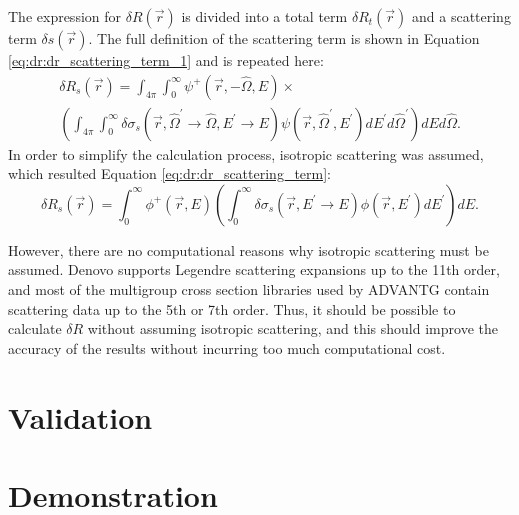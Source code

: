 The expression for $\delta R\left(\vec{r}\right)$ is divided into a total term $\delta R_t\left(\vec{r}\right)$ and a scattering term $\delta s\left(\vec{r}\right)$.
The full definition of the scattering term is shown in Equation \ref{eq:dr:dr_scattering_term_1} and is repeated here:
\begin{multline*}
  \delta R_s\left(\vec{r}\right) =
  \int_{4\pi}\int_0^\infty\psi^+\left(\vec{r},-\hat{\Omega},E\right) \times \\
  \left(\int_{4\pi}\int_0^\infty\delta\sigma_s\left(\vec{r},\hat{\Omega}^\prime\rightarrow\hat{\Omega},E^\prime\rightarrow E\right)\psi\left(\vec{r},\hat{\Omega}^\prime,E^\prime\right)dE^\prime d\hat{\Omega}^\prime\right)dEd\hat{\Omega}.
\end{multline*}
In order to simplify the calculation process, isotropic scattering was assumed, which resulted Equation \ref{eq:dr:dr_scattering_term}:
\begin{equation*}
  \delta R_s\left(\vec{r}\right) =
  \int_0^\infty\phi^+\left(\vec{r},E\right)\left(\int_0^\infty\delta\sigma_s\left(\vec{r},E^\prime\rightarrow E\right)\phi\left(\vec{r},E^\prime\right)dE^\prime\right)dE.
\end{equation*}

However, there are no computational reasons why isotropic scattering must be assumed.
Denovo supports Legendre scattering expansions up to the 11th order, and most of the multigroup cross section libraries used by ADVANTG contain scattering data up to the 5th or 7th order.
Thus, it should be possible to calculate $\delta R$ without assuming isotropic scattering, and this should improve the accuracy of the results without incurring too much computational cost.


\section{Validation}
\label{sec:proposal:validation}

\section{Demonstration}
\label{sec:proposal:demonstration}

